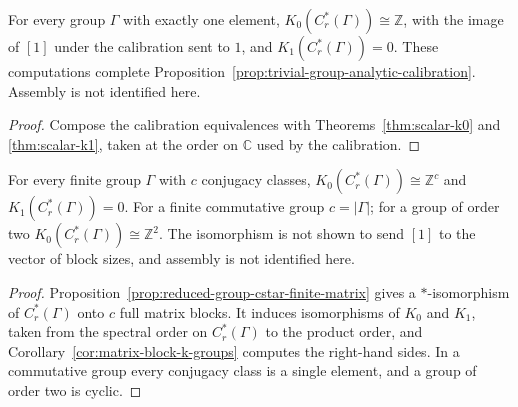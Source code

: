 \begin{proposition}\label{prop:trivial-group-scalar-k-groups}
\leanok
For every group $\Gamma$ with exactly one element,
$K_0(C^*_r(\Gamma))\cong\mathbb Z$, with the image of $[1]$ under the
calibration sent to $1$, and $K_1(C^*_r(\Gamma))=0$. These computations
complete Proposition~\ref{prop:trivial-group-analytic-calibration}. Assembly
is not identified here.
\end{proposition}
\begin{proof}
\leanok
Compose the calibration equivalences with Theorems~\ref{thm:scalar-k0} and
\ref{thm:scalar-k1}, taken at the order on $\mathbb C$ used by the calibration.
\end{proof}

\begin{proposition}\label{prop:finite-group-k-groups}
\leanok
For every finite group $\Gamma$ with $c$ conjugacy classes,
$K_0(C^*_r(\Gamma))\cong\mathbb Z^c$ and $K_1(C^*_r(\Gamma))=0$. For a finite
commutative group $c=|\Gamma|$; for a group of order two
$K_0(C^*_r(\Gamma))\cong\mathbb Z^2$. The isomorphism is not shown to send $[1]$
to the vector of block sizes, and assembly is not identified here.
\end{proposition}
\begin{proof}
\leanok
Proposition~\ref{prop:reduced-group-cstar-finite-matrix} gives a
$*$-isomorphism of $C^*_r(\Gamma)$ onto $c$ full matrix blocks. It induces
isomorphisms of $K_0$ and $K_1$, taken from the spectral order on
$C^*_r(\Gamma)$ to the product order, and Corollary~\ref{cor:matrix-block-k-groups}
computes the right-hand sides. In a commutative group every conjugacy class is a
single element, and a group of order two is cyclic.
\end{proof}

